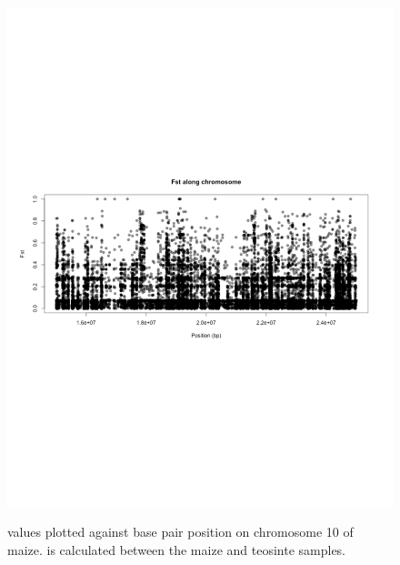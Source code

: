 \begin{figure}
\centering
\caption{\fst values plotted against base pair position on chromosome 10 of maize. \fst is calculated between the maize and teosinte samples.}
\includegraphics[width=\linewidth]{figures/supp3.pdf}
\label{fig:suppfst}
\end{figure}


